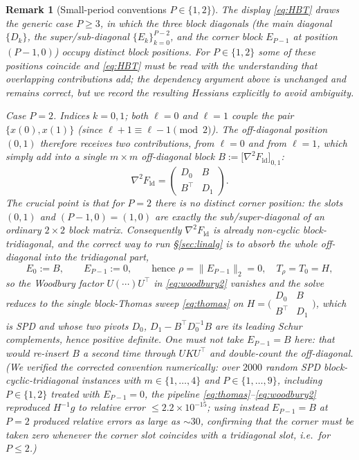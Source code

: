 \documentclass{amsart}
\newtheorem{remark}{Remark}
\begin{document}
\begin{remark}[Small-period conventions $P\in\{1,2\}$]\label{rem:smallP}
The display \eqref{eq:HBT} draws the generic case $P\ge3$, in which the three
block diagonals (the main diagonal $\{D_k\}$, the super/sub-diagonal $\{E_k\}_{k=0}^{P-2}$,
and the corner block $E_{P-1}$ at position $(P-1,0)$) occupy \emph{distinct} block
positions. For $P\in\{1,2\}$ some of these positions coincide and \eqref{eq:HBT}
must be read with the understanding that overlapping contributions \emph{add}; the
dependency argument above is unchanged and remains correct, but we record the
resulting Hessians explicitly to avoid ambiguity.

\emph{Case $P=2$.} Indices $k=0,1$; both $\ell=0$ and $\ell=1$ couple the pair
$\{x(0),x(1)\}$ (since $\ell+1\equiv\ell-1\pmod2$). The off-diagonal position
$(0,1)$ therefore receives \emph{two} contributions, from $\ell=0$ and from
$\ell=1$, which simply \emph{add} into a single $m\times m$ off-diagonal block
$B:=\big[\nabla^2F_{\mathrm{ld}}\big]_{0,1}$:
\[
  \nabla^2F_{\mathrm{ld}}=\begin{pmatrix} D_0 & B\\ B^{\!\top} & D_1\end{pmatrix}.
\]
The crucial point is that for $P=2$ \emph{there is no distinct corner position}: the
slots $(0,1)$ and $(P-1,0)=(1,0)$ are exactly the sub/super-diagonal of an
ordinary $2\times2$ block matrix. Consequently $\nabla^2F_{\mathrm{ld}}$ is
\emph{already} non-cyclic block-tridiagonal, and the correct way to run
\S\ref{sec:linalg} is to absorb the whole off-diagonal into the tridiagonal part,
\[
  E_0:=B,\qquad E_{P-1}:=0,\qquad\text{hence } \rho=\|E_{P-1}\|_2=0,\quad T_\rho=T_0=H,
\]
so the Woodbury factor $U(\cdots)U^{\!\top}$ in \eqref{eq:woodbury2} vanishes and the
solve reduces to the single block-Thomas sweep \eqref{eq:thomas} on
$H=\big(\begin{smallmatrix}D_0&B\\B^{\!\top}&D_1\end{smallmatrix}\big)$, which is SPD
and whose two pivots $D_0$, $D_1-B^{\!\top}D_0^{-1}B$ are its leading Schur
complements, hence positive definite. \emph{One must not} take $E_{P-1}=B$ here:
that would re-insert $B$ a second time through $UKU^{\!\top}$ and double-count the
off-diagonal. (We verified the corrected convention numerically: over $2000$ random
SPD block-cyclic-tridiagonal instances with $m\in\{1,\dots,4\}$ and
$P\in\{1,\dots,9\}$, including $P\in\{1,2\}$ treated with $E_{P-1}=0$, the pipeline
\eqref{eq:thomas}--\eqref{eq:woodbury2} reproduced $H^{-1}g$ to relative error
$\le 2.2\times10^{-15}$; using instead $E_{P-1}=B$ at $P=2$ produced relative errors
as large as $\sim 30$, confirming that the corner must be taken zero whenever the
corner slot coincides with a tridiagonal slot, i.e.\ for $P\le 2$.)


\end{remark}
\end{document}

